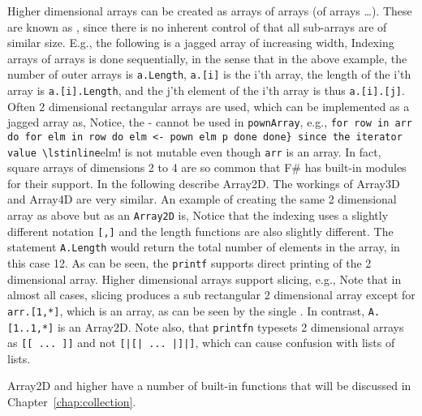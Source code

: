 Higher dimensional arrays can be created as arrays of arrays (of arrays \dots). These are known as , since there is no inherent control of that all sub-arrays are of similar size. E.g., the following is a jagged array of increasing width,
%
%
Indexing arrays of arrays is done sequentially, in the sense that in the above example, the number of outer arrays is \lstinline|a.Length|,  \lstinline|a.[i]| is the i'th array, the length of the i'th array is \lstinline|a.[i].Length|, and the j'th element of the i'th array is thus \lstinline|a.[i].[j]|. Often 2 dimensional rectangular arrays are used, which can be implemented as a jagged array as,
%
%
Notice, the - cannot be used in \lstinline!pownArray!, e.g., \lstinline!for row in arr do for elm in row do elm <- pown elm p done done} since the iterator value \lstinline!elm! is not mutable even though \lstinline!arr! is an array.
%
In fact, square arrays of dimensions 2 to 4 are so common that F\# has built-in modules for their support. In the following describe Array2D. The workings of Array3D and Array4D are very similar. An example of creating the same 2 dimensional array as above but as an \lstinline{Array2D} is,
%
%
Notice that the indexing uses a slightly different notation \lstinline|[,]| and the length functions are also slightly different. The statement \lstinline|A.Length| would return the total number of elements in the array, in this case 12. As can be seen, the \lstinline!printf! supports direct printing of the 2 dimensional array. Higher dimensional arrays support slicing, e.g.,
%
%
Note that in almost all cases, slicing produces a sub rectangular 2 dimensional array except for \lstinline{arr.[1,*]}, which is an array, as can be seen by the single \lexeme{[}. In contrast, \lstinline{A.[1..1,*]} is an Array2D. Note also, that \lstinline!printfn! typesets 2 dimensional arrays as \lstinline{[[ ... ]]} and not \lstinline{[|[| ... |]|]}, which can cause confusion with lists of lists.

Array2D and higher have a number of built-in functions that will be discussed in Chapter~\ref{chap:collection}.


